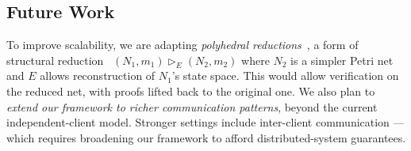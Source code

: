 \subsection{Future Work}
To improve scalability, we are adapting \textit{polyhedral reductions}~\cite{AmBeDa21,amat2022polyhedral}, a form of structural reduction~\cite{Be87,BeLeDa20} $(N_1, m_1) \vartriangleright_E (N_2, m_2)$ where $N_2$ is a simpler Petri net and $E$ allows reconstruction of $N_1$’s state space. This would allow verification on the reduced net, with proofs lifted back to the original one.
%
We also plan to \textit{extend our framework to richer communication patterns}, beyond the current independent-client model. Stronger settings include inter-client communication ---
which requires 
broadening our framework to afford distributed-system guarantees.
%
%
%
%
%
%
%
%
%


